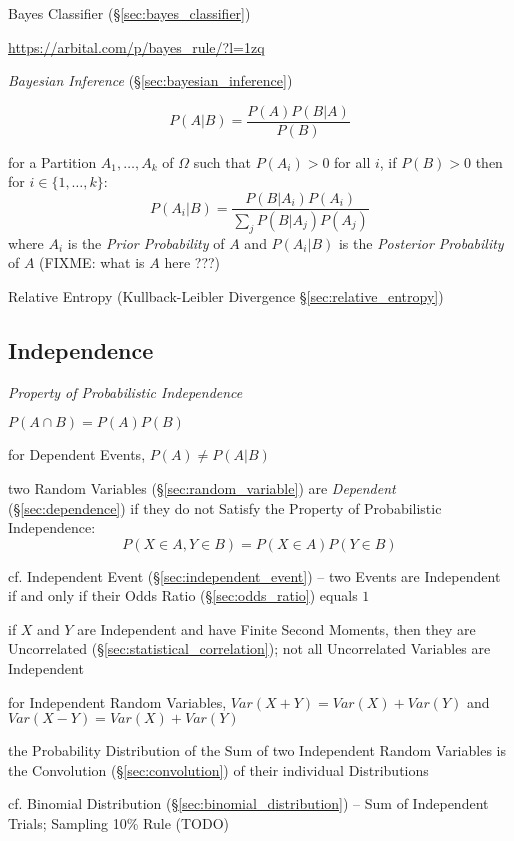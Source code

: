 \fist Bayes Classifier (\S\ref{sec:bayes_classifier})

\url{https://arbital.com/p/bayes_rule/?l=1zq}

\emph{Bayesian Inference} (\S\ref{sec:bayesian_inference})

\[
  P(A|B) = \frac{P(A)P(B|A)}{P(B)}
\]

for a Partition $A_1, \ldots, A_k$ of $\Omega$ such that $P(A_i) > 0$ for all
$i$, if $P(B) > 0$ then for $i \in \{1, \ldots, k\}$:
\[
  P(A_i|B) = \frac{
    P(B|A_i)P(A_i)
  }{
    \sum_j P(B|A_j)P(A_j)
  }
\]
where $A_i$ is the \emph{Prior Probability} of $A$ and $P(A_i|B)$ is the
\emph{Posterior Probability} of $A$ (FIXME: what is $A$ here ???)

\fist Relative Entropy (Kullback-Leibler Divergence
\S\ref{sec:relative_entropy})



\subsection{Independence}\label{sec:independence}

\emph{Property of Probabilistic Independence}

$P(A \cap B) = P(A)P(B)$

for Dependent Events, $P(A) \neq P(A|B)$

two Random Variables (\S\ref{sec:random_variable}) are \emph{Dependent}
(\S\ref{sec:dependence}) if they do not Satisfy the Property of
Probabilistic Independence:
\[
  P(X \in A, Y \in B) = P(X \in A) P(Y \in B)
\]

\fist cf. Independent Event (\S\ref{sec:independent_event}) --
two Events are Independent if and only if their Odds Ratio
(\S\ref{sec:odds_ratio}) equals $1$

if $X$ and $Y$ are Independent and have Finite Second Moments, then they are
Uncorrelated (\S\ref{sec:statistical_correlation}); not all Uncorrelated
Variables are Independent

for Independent Random Variables, $Var(X + Y) = Var(X) + Var(Y)$ and
$Var(X - Y) = Var(X) + Var(Y)$

the Probability Distribution of the Sum of two Independent Random Variables is
the Convolution (\S\ref{sec:convolution}) of their individual Distributions

cf. Binomial Distribution (\S\ref{sec:binomial_distribution}) -- Sum of
Independent Trials; Sampling 10\% Rule (TODO)

